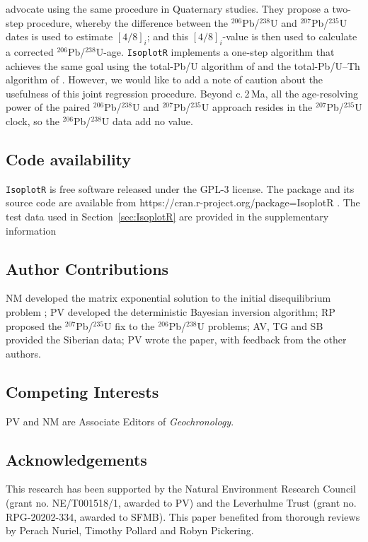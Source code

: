 \documentclass{article}
\begin{document}
\citet{engel2019} advocate using the same procedure in Quaternary
studies.  They propose a two-step procedure, whereby the difference
between the ${}^{206}$Pb/${}^{238}$U and ${}^{207}$Pb/${}^{235}$U
dates is used to estimate $[4/8]_i$; and this $[4/8]_i$-value is
then used to calculate a corrected
${}^{206}$Pb/${}^{238}$U-age. \texttt{IsoplotR} implements a one-step
algorithm that achieves the same goal using the total-Pb/U algorithm
of \citet{ludwig1998} and the total-Pb/U--Th algorithm of
\citet{vermeesch2020}. However, we would like to add a note of caution
about the usefulness of this joint regression procedure. Beyond
c.\,2\,Ma, all the age-resolving power of the paired
${}^{206}$Pb/${}^{238}$U and ${}^{207}$Pb/${}^{235}$U approach resides
in the ${}^{207}$Pb/${}^{235}$U clock, so the ${}^{206}$Pb/${}^{238}$U
data add no value.

\subsection*{Code availability}

\texttt{IsoplotR} is free software released under the GPL-3
license. The package and its source code are available from
https://cran.r-project.org/package=IsoplotR \citep[last access:
  July~21, 2025,][]{vermeesch2018c}. The test data used in
Section~\ref{sec:IsoplotR} are provided in the supplementary
information \citep{vermeesch2025z}

\subsection*{Author Contributions}

NM developed the matrix exponential solution to the initial
disequilibrium problem \citep{mclean2016b}; PV developed the
deterministic Bayesian inversion algorithm; RP proposed the
${}^{207}$Pb/${}^{235}$U fix to the ${}^{206}$Pb/${}^{238}$U problems;
AV, TG and SB provided the Siberian data; PV wrote the paper, with
feedback from the other authors.

\subsection*{Competing Interests}

PV and NM are Associate Editors of \emph{Geochronology}.

\subsection*{Acknowledgements}
This research has been supported by the Natural Environment Research
Council (grant no. NE/T001518/1, awarded to PV) and the Leverhulme
Trust (grant no. RPG-20202-334, awarded to SFMB). This paper benefited
from thorough reviews by Perach Nuriel, Timothy Pollard and Robyn
Pickering.



\end{document}

